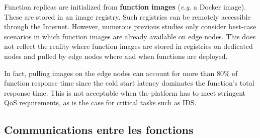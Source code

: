Function replicas are initialized from \textbf{function images} (\textit{e.g.} a Docker image). These are stored in an image registry. Such registries can be remotely accessible through the Internet. %
However, numerous previous studies \cite{bhasiCypressInputSizesensitive2022, zijunFassflowEfficient2022, smithFaDOFaaSFunctions2022, zhangFIRSTExploitingMultiDimensional2023} only consider best-case scenarios in which function images are already available on edge nodes. This does not reflect the reality where function images are stored in registries on dedicated nodes and pulled by edge nodes where and when functions are deployed. %

In fact, pulling images on the edge nodes can account for more than 80\% of function response time \cite{yanHermesEfficientCache2020} since the cold start latency dominates the function's total response time. This is not acceptable when the platform has to meet stringent QoS requirements, as is the case for critical tasks such as IDS.



\subsection{Communications entre les fonctions}
\label{section:herocache-background-communications}

